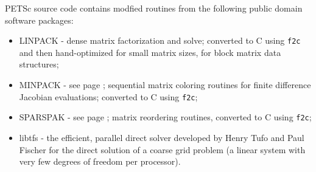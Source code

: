 \vspace{.3in}
\noindent
PETSc source code contains modfied routines from the following public domain software packages:
\begin{itemize}
  \item LINPACK -    dense matrix factorization and solve; converted to C using {\tt f2c} and then
                     hand-optimized for small matrix sizes, for block matrix data structures;
  \item MINPACK -    see page \pageref{sec_fdmatrix}; sequential matrix coloring routines for finite difference Jacobian
                     evaluations; converted to C using {\tt f2c};
  \item SPARSPAK -   see page \pageref{sec_factorization}; matrix reordering routines, converted to C using {\tt f2c};
  \item libtfs     - the efficient, parallel direct solver developed by Henry Tufo and Paul Fischer for the direct solution of a coarse grid problem
                     (a linear system with very few degrees of freedom per processor).
\end{itemize}


